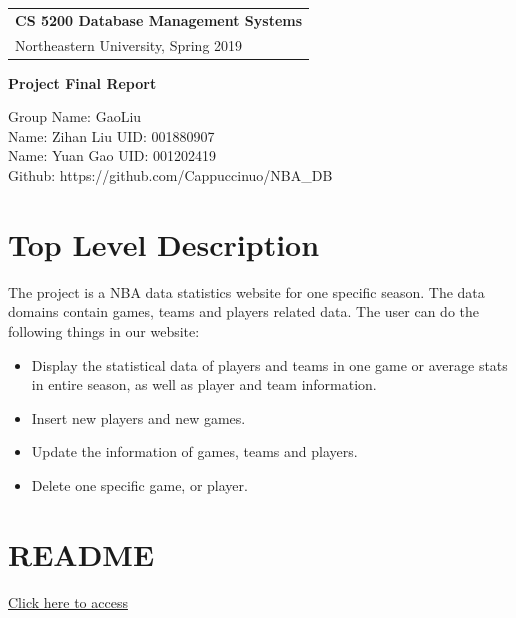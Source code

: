 \documentclass[a4paper,12pt]{article} %
\begin{document}
\thispagestyle{empty} %

\begin{tabular}{p{15.5cm}} %
{\large \bf CS 5200 Database Management Systems} \\
Northeastern University, Spring 2019  \\
\hline %
\end{tabular} %

\vspace*{0.3cm} %

\begin{center} %
    {\Large \bf Project Final Report} %
    \vspace{2mm}
    
    {Group Name: GaoLiu}\\
    {Name: Zihan Liu UID: 001880907}\\
    {Name: Yuan Gao UID: 001202419}\\
    {Github: https://github.com/Cappuccinuo/NBA\_DB}
\end{center} 
%
\vspace{0.2cm}
\section{Top Level Description}
The project is a NBA data statistics website for one specific season. 
The data domains contain games, teams and players related data. The user can do the following things in our website:
\begin{itemize}
    \item Display the statistical data of players and teams in one game or average stats in entire season, as well as player and team information.
    \item Insert new players and new games.
    \item Update the information of games, teams and players.
    \item Delete one specific game, or player.
\end{itemize}
\section{README}
\href{https://github.com/Cappuccinuo/NBA_DB/blob/master/README.md}{Click here to access}
\end{document}
